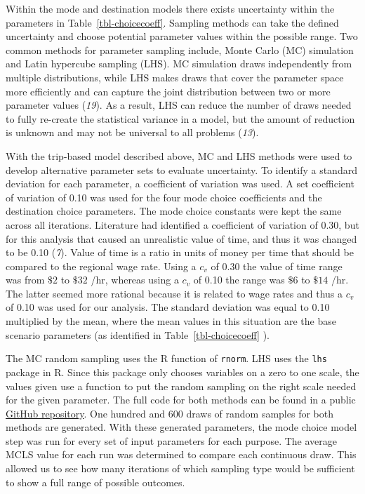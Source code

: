 \documentclass[
  letterpaper,
]{trb}
\begin{document}
Within the mode and destination models there exists uncertainty within
the parameters in Table~\ref{tbl-choicecoeff}. Sampling methods can take
the defined uncertainty and choose potential parameter values within the
possible range. Two common methods for parameter sampling include, Monte
Carlo (MC) simulation and Latin hypercube sampling (LHS). MC simulation
draws independently from multiple distributions, while LHS makes draws
that cover the parameter space more efficiently and can capture the
joint distribution between two or more parameter values (\emph{19}). As
a result, LHS can reduce the number of draws needed to fully re-create
the statistical variance in a model, but the amount of reduction is
unknown and may not be universal to all problems (\emph{13}).

With the trip-based model described above, MC and LHS methods were used
to develop alternative parameter sets to evaluate uncertainty. To
identify a standard deviation for each parameter, a coefficient of
variation was used. A set coefficient of variation of 0.10 was used for
the four mode choice coefficients and the destination choice parameters.
The mode choice constants were kept the same across all iterations.
Literature had identified a coefficient of variation of 0.30, but for
this analysis that caused an unrealistic value of time, and thus it was
changed to be 0.10 (\emph{7}). Value of time is a ratio in units of
money per time that should be compared to the regional wage rate. Using
a \(c_v\) of 0.30 the value of time range was from \(\$2\) to \(\$32\)
/hr, whereas using a \(c_v\) of 0.10 the range was \(\$6\) to \(\$14\)
/hr. The latter seemed more rational because it is related to wage rates
and thus a \(c_v\) of 0.10 was used for our analysis. The standard
deviation was equal to 0.10 multiplied by the mean, where the mean
values in this situation are the base scenario parameters (as identified
in Table~\ref{tbl-choicecoeff} ).

The MC random sampling uses the R function of \texttt{rnorm}. LHS uses
the \texttt{lhs} package in R. Since this package only chooses variables
on a zero to one scale, the values given use a function to put the
random sampling on the right scale needed for the given parameter. The
full code for both methods can be found in a public
\href{https://github.com/natmaegray/sensitivity_thesis}{GitHub
repository}. One hundred and 600 draws of random samples for both
methods are generated. With these generated parameters, the mode choice
model step was run for every set of input parameters for each purpose.
The average MCLS value for each run was determined to compare each
continuous draw. This allowed us to see how many iterations of which
sampling type would be sufficient to show a full range of possible
outcomes.
\end{document}
